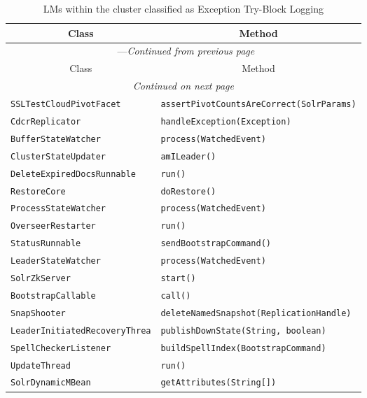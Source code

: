 \begin{center}
\begin{longtable}{ll}
\caption{LMs within the cluster classified as Exception Try-Block Logging}\\
\toprule\multicolumn{1}{c}{Class}&\multicolumn{1}{c}{Method}\\\midrule
\endfirsthead

\multicolumn{2}{c}{\tablename\ \thetable{}---\textit{Continued from previous page}} \\\midrule
\multicolumn{1}{c}{Class}&\multicolumn{1}{c}{Method}\\\midrule
\endhead
\multicolumn{2}{c}{\textit{Continued on next page}}\\\midrule
\endfoot
\bottomrule
\endlastfoot

\lstinline/SSLTestCloudPivotFacet/&{\lstinline/assertPivotCountsAreCorrect(SolrParams)/}\\
\lstinline/CdcrReplicator/&{\lstinline/handleException(Exception)/}\\
\lstinline/BufferStateWatcher/&{\lstinline/process(WatchedEvent)/}\\
\lstinline/ClusterStateUpdater/&{\lstinline/amILeader()/}\\
\lstinline/DeleteExpiredDocsRunnable/&{\lstinline/run()/}\\
\lstinline/RestoreCore/&{\lstinline/doRestore()/}\\
\lstinline/ProcessStateWatcher/&{\lstinline/process(WatchedEvent)/}\\
\lstinline/OverseerRestarter/&{\lstinline/run()/}\\
\lstinline/StatusRunnable/&{\lstinline/sendBootstrapCommand()/}\\
\lstinline/LeaderStateWatcher/&{\lstinline/process(WatchedEvent)/}\\
\lstinline/SolrZkServer/&{\lstinline/start()/}\\
\lstinline/BootstrapCallable/&{\lstinline/call()/}\\
\lstinline/SnapShooter/&{\lstinline/deleteNamedSnapshot(ReplicationHandle)/}\\
\lstinline/LeaderInitiatedRecoveryThrea/&{\lstinline/publishDownState(String, boolean)/}\\
\lstinline/SpellCheckerListener/&{\lstinline/buildSpellIndex(BootstrapCommand)/}\\
\lstinline/UpdateThread/&{\lstinline/run()/}\\
\lstinline/SolrDynamicMBean/&{\lstinline/getAttributes(String[])/}\\

\end{longtable}
\end{center}
